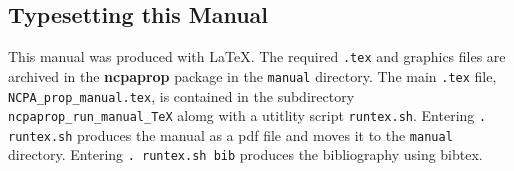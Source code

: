 \subsection{Typesetting this Manual}

This manual was produced with LaTeX. The required \verb+.tex+ and graphics files are archived in the \textbf{ncpaprop} package in the \verb+manual+ directory. The main \verb+.tex+ file, \verb+NCPA_prop_manual.tex+, is contained in the subdirectory \verb+ncpaprop_run_manual_TeX+ alomg with a utitlity script \verb+runtex.sh+. Entering \verb+. runtex.sh+ produces the manual as a pdf file and moves it to the \verb+manual+ directory. Entering \verb+. runtex.sh bib+ produces the bibliography using bibtex. 